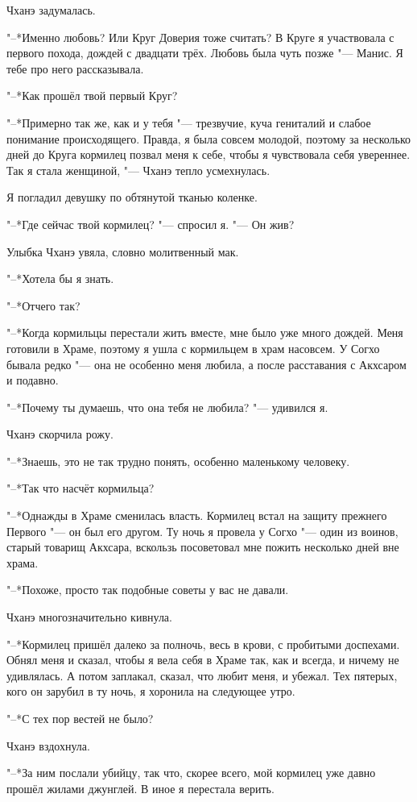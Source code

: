 Чханэ задумалась.

"--*Именно любовь?
Или Круг Доверия тоже считать?
В Круге я участвовала с первого похода, дождей с двадцати трёх.
Любовь была чуть позже "--- Манис.
Я тебе про него рассказывала.

"--*Как прошёл твой первый Круг?

"--*Примерно так же, как и у тебя "--- трезвучие, куча гениталий и слабое понимание происходящего.
Правда, я была совсем молодой, поэтому за несколько дней до Круга кормилец позвал меня к себе, чтобы я чувствовала себя увереннее.
Так я стала женщиной, "--- Чханэ тепло усмехнулась.

Я погладил девушку по обтянутой тканью коленке.

"--*Где сейчас твой кормилец? "--- спросил я.
"--- Он жив?

Улыбка Чханэ увяла, словно молитвенный мак.

"--*Хотела бы я знать.

"--*Отчего так?

"--*Когда кормильцы перестали жить вместе, мне было уже много дождей.
Меня готовили в Храме, поэтому я ушла с кормильцем в храм насовсем.
У Согхо бывала редко "--- она не особенно меня любила, а после расставания с Акхсаром и подавно.

"--*Почему ты думаешь, что она тебя не любила? "--- удивился я.

Чханэ скорчила рожу.

"--*Знаешь, это не так трудно понять, особенно маленькому человеку.

"--*Так что насчёт кормильца?

"--*Однажды в Храме сменилась власть.
Кормилец встал на защиту прежнего Первого "--- он был его другом.
Ту ночь я провела у Согхо "--- один из воинов, старый товарищ Акхсара, вскользь посоветовал мне пожить несколько дней вне храма.

"--*Похоже, просто так подобные советы у вас не давали.

Чханэ многозначительно кивнула.

"--*Кормилец пришёл далеко за полночь, весь в крови, с пробитыми доспехами.
Обнял меня и сказал, чтобы я вела себя в Храме так, как и всегда, и ничему не удивлялась.
А потом заплакал, сказал, что любит меня, и убежал.
Тех пятерых, кого он зарубил в ту ночь, я хоронила на следующее утро.

"--*С тех пор вестей не было?

Чханэ вздохнула.

"--*За ним послали убийцу, так что, скорее всего, мой кормилец уже давно прошёл жилами джунглей.
В иное я перестала верить.

